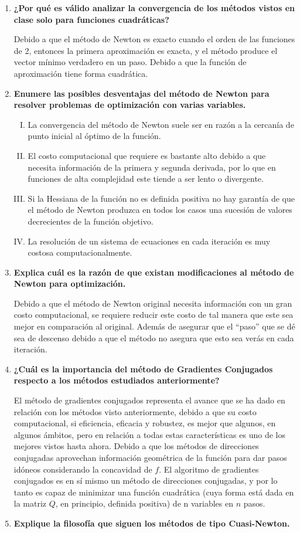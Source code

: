 \documentclass[12pt]{article}
\begin{document}
\begin{enumerate}
    \item \textbf{¿Por qué es válido analizar la convergencia de los métodos vistos en clase
    solo para funciones cuadráticas?}

    Debido a que el método de Newton es exacto cuando el orden de las funciones de 2, entonces la primera aproximación es exacta, y el método produce el vector mínimo verdadero en un paso. Debido a que la función de aproximación tiene forma cuadrática.
    \item \textbf{ Enumere las posibles desventajas del método de Newton para resolver problemas de optimización con varias variables.}
    
    \begin{enumerate}[I.]
        \item La convergencia del método de Newton suele ser en razón a la cercanía de punto inicial al óptimo de la función.
        \item El costo computacional que requiere es bastante alto debido a que necesita información de la primera y segunda derivada, por lo que en funciones de alta complejidad este tiende a ser lento o divergente.
        \item Si la Hessiana de la función no es definida positiva no hay garantía de que el método de Newton produzca en todos los casos una sucesión de valores decrecientes de la función objetivo.
        \item La resolución de un sistema de ecuaciones en cada iteración es muy costosa computacionalmente.
    \end{enumerate}
    \item \textbf{Explica cuál es la razón de que existan modificaciones al método de Newton para optimización.}
    
    Debido a que el método de Newton original necesita información con un gran costo computacional, se requiere reducir este costo de tal manera que este sea mejor en comparación al original. Además de asegurar que el “paso” que se dé sea de descenso debido a que el método no asegura que esto sea verás en cada iteración.
    \item \textbf{¿Cuál es la importancia del método de Gradientes Conjugados respecto a los métodos estudiados anteriormente?}
    
    El método de gradientes conjugados representa el avance que se ha dado en relación con los métodos visto anteriormente, debido a que su costo computacional, si eficiencia, eficacia y robustez, es mejor que algunos, en algunos ámbitos, pero en relación a todas estas características es uno de los mejores vistos hasta ahora. Debido a que los métodos de direcciones conjugadas aprovechan información geométrica de la función para dar pasos idóneos considerando la concavidad de $f$.
    El algoritmo de gradientes conjugados es en sí mismo un método de direcciones conjugadas, y por lo tanto es capaz de minimizar una función cuadrática (cuya forma está dada en la matriz $Q$, en principio, definida positiva) de n variables en $n$ pasos.
    \item \textbf{Explique la filosofía que siguen los métodos de tipo Cuasi-Newton.}
    

\end{enumerate}
\end{document}
